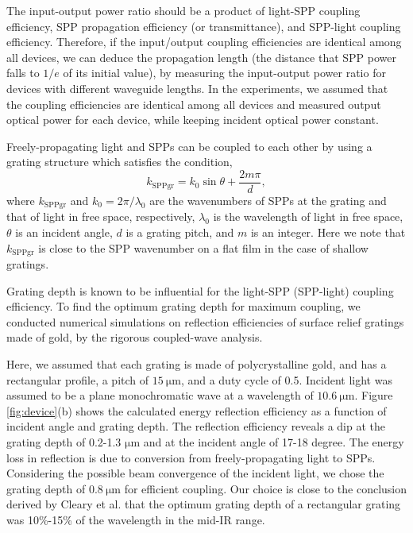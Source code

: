 \documentclass[aip,apl,reprint]{revtex4-1}
\begin{document}
The input-output power ratio should be a product of light-SPP coupling efficiency, SPP propagation efficiency (or transmittance), and SPP-light coupling efficiency. Therefore, if the input/output coupling efficiencies are identical among all devices, we can deduce the propagation length (the distance that SPP power falls to $1/e$ of its initial value), by measuring the input-output power ratio for devices with different waveguide lengths.  In the experiments, we assumed that the coupling efficiencies are identical among all devices and measured output optical power for each device, while keeping incident optical power constant. 

Freely-propagating light and SPPs can be coupled to each other by using a grating structure which satisfies the condition\cite{Koev},
\begin{equation}
k_{\mathrm{SPPgr}}=k_0 \sin \theta + \frac{2m\pi}{d},
\label{eq:phase-match}
\end{equation}
where $k_{\mathrm{SPPgr}}$ and $k_0=2\pi/\lambda_0$ are the wavenumbers of SPPs at the grating and that of light in free space, respectively, $\lambda_0$ is the wavelength of light in free space, $\theta$ is an incident angle, $d$ is a grating pitch, and $m$ is an integer. Here we note that $k_{\mathrm{SPPgr}}$ is close to the SPP wavenumber on a flat film in the case of shallow gratings.

Grating depth is known to be influential for the light-SPP (SPP-light) coupling efficiency\cite{Koev, Cleary2010}. To find the optimum grating depth for maximum coupling, we conducted numerical simulations on reflection efficiencies of surface relief gratings made of gold, by the rigorous coupled-wave analysis\cite{Moharam}. 

Here, we assumed that each grating is made of polycrystalline gold, and has a rectangular profile, a pitch of $15\:\mathrm{\mu m}$, and a duty cycle of 0.5. Incident light was assumed to be a plane monochromatic wave at a wavelength of $10.6\:\mathrm{\mu m}$. 
Figure \ref{fig:device}(b) shows the calculated energy reflection efficiency as a function of incident angle and grating depth. The reflection efficiency reveals a dip at the grating depth of 0.2-1.3 $\mathrm{\mu m}$ and at the incident angle of 17-18 degree. The energy loss in reflection is due to conversion from freely-propagating light to SPPs.
Considering the possible beam convergence of the incident light, we chose the grating depth of $0.8\:\mathrm{\mu m}$ for efficient coupling. Our choice is close to the conclusion derived by Cleary et al.\cite{Cleary2010} that the optimum grating depth of a rectangular grating was 10\%-15\% of the wavelength in the mid-IR range.
\end{document}
